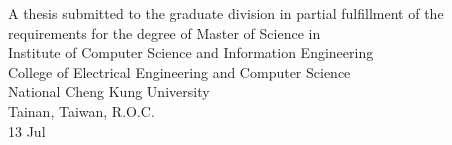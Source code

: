 
\singlespacing
\newpage
{}
\thispagestyle{empty}
\begin{center}

\begin{minipage}[c][3.5cm][t]{\textwidth}
  \begin{center}
    \vspace{0.4cm}


    \vspace{0.5cm}


    \vspace{0.5cm}

  \end{center}
\end{minipage}

\vspace{1.2cm}


\begin{minipage}[c][5cm][t]{\textwidth}
  \begin{center}\Large A thesis submitted to the graduate division in partial fulfillment
  of the requirements for the degree of Master of Science in\\
  Institute of Computer Science and Information Engineering\\ %
  College of Electrical Engineering and Computer Science\\ %
  National Cheng Kung University\\ %
  Tainan, Taiwan, R.O.C.\\
  \vspace{0.1cm}
  13 \thinspace \thinspace Jul \thinspace {}
  \end{center}
\end{minipage}


\end{center}
